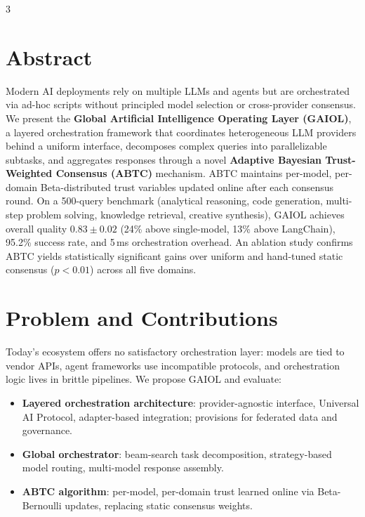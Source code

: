 \documentclass[14pt]{article}
\begin{document}
\sloppy
\begin{multicols}{3}

\section*{Abstract}
Modern AI deployments rely on multiple LLMs and agents but are orchestrated via ad-hoc scripts without principled model selection or cross-provider consensus. We present the \textbf{Global Artificial Intelligence Operating Layer (GAIOL)}, a layered orchestration framework that coordinates heterogeneous LLM providers behind a uniform interface, decomposes complex queries into parallelizable subtasks, and aggregates responses through a novel \textbf{Adaptive Bayesian Trust-Weighted Consensus (ABTC)} mechanism. ABTC maintains per-model, per-domain Beta-distributed trust variables updated online after each consensus round. On a 500-query benchmark (analytical reasoning, code generation, multi-step problem solving, knowledge retrieval, creative synthesis), GAIOL achieves overall quality $0.83 \pm 0.02$ (24\% above single-model, 13\% above LangChain), 95.2\% success rate, and 5\,ms orchestration overhead. An ablation study confirms ABTC yields statistically significant gains over uniform and hand-tuned static consensus ($p < 0.01$) across all five domains.

\section*{Problem and Contributions}
Today's ecosystem offers no satisfactory orchestration layer: models are tied to vendor APIs, agent frameworks use incompatible protocols, and orchestration logic lives in brittle pipelines. We propose GAIOL and evaluate:
\begin{itemize}
\item \textbf{Layered orchestration architecture}: provider-agnostic interface, Universal AI Protocol, adapter-based integration; provisions for federated data and governance.
\item \textbf{Global orchestrator}: beam-search task decomposition, strategy-based model routing, multi-model response assembly.
\item \textbf{ABTC algorithm}: per-model, per-domain trust learned online via Beta-Bernoulli updates, replacing static consensus weights.
\end{itemize}


\end{multicols}
\end{document}
